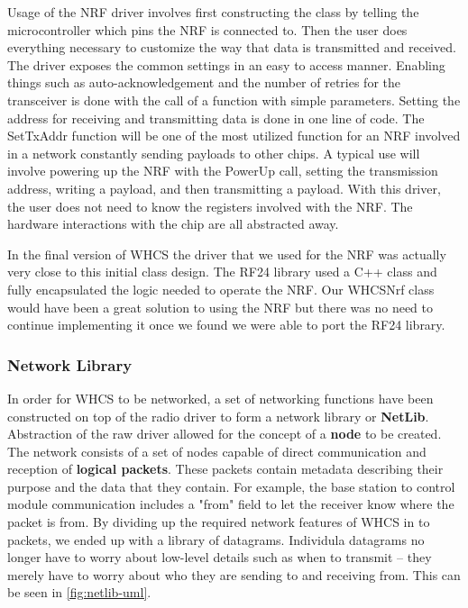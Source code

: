 Usage of the NRF driver involves first constructing the class by telling
the microcontroller which pins the NRF is connected to. Then the user 
does everything necessary to customize the way that data is transmitted and
received. The driver exposes the common settings in an easy to access manner.
Enabling things such as auto{}-acknowledgement and the number of retries for
the transceiver is done with the call of a function with simple parameters.
Setting the address for receiving and transmitting data is done in one line
of code. The SetTxAddr function will be one of the most utilized function for
an NRF involved in a network constantly sending payloads to other chips. A
typical use will involve powering up the NRF with the PowerUp call, setting the
transmission address, writing a payload, and then transmitting a payload. With
this driver, the user does not need to know the registers involved with the
NRF. The hardware interactions with the chip are all abstracted away.

In the final version of WHCS the driver that we used for the NRF was actually very close to this initial class design. The RF24 library used a C++ class and fully encapsulated the logic needed to operate the NRF. Our WHCSNrf class would have been a great solution to using the NRF but there was no need to continue implementing it once we found we were able to port the RF24 library.

\subsubsection{Network Library}
\label{sec:network-library}

In order for WHCS to be networked, a set of networking functions have been
constructed on top of the radio driver to form a network library or
\textbf{NetLib}. Abstraction of the raw driver allowed for the concept of a
\textbf{node} to be created. The network consists of a set of nodes capable
of direct communication and reception of \textbf{logical packets}. These
packets contain metadata describing their purpose and the data that they
contain. For example, the base station to control module communication includes a "from" field to let the receiver know where the packet is from. By dividing up the required network features of WHCS in to packets, we
ended up with a library of datagrams. Individula datagrams no longer have to worry about
low-level details such as when to transmit -- they merely have to worry about
who they are sending to and receiving from. This can be seen in
\autoref{fig:netlib-uml}.


